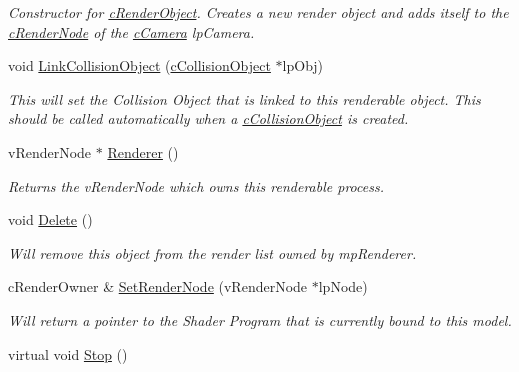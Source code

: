 \begin{DoxyCompactItemize}
\begin{DoxyCompactList}\small\item\em Constructor for \hyperlink{classc_render_object}{cRenderObject}. Creates a new render object and adds itself to the \hyperlink{classc_render_node}{cRenderNode} of the \hyperlink{classc_camera}{cCamera} lpCamera. \end{DoxyCompactList}\item 
\hypertarget{classc_render_object_a9cd352514159783b312cf9d3a6168e8e}{
void \hyperlink{classc_render_object_a9cd352514159783b312cf9d3a6168e8e}{LinkCollisionObject} (\hyperlink{classc_collision_object}{cCollisionObject} $\ast$lpObj)}
\label{classc_render_object_a9cd352514159783b312cf9d3a6168e8e}

\begin{DoxyCompactList}\small\item\em This will set the Collision Object that is linked to this renderable object. This should be called automatically when a \hyperlink{classc_collision_object}{cCollisionObject} is created. \end{DoxyCompactList}\item 
\hypertarget{classc_render_object_a532344b60df3ebd0cf893fa550df318e}{
vRenderNode $\ast$ \hyperlink{classc_render_object_a532344b60df3ebd0cf893fa550df318e}{Renderer} ()}
\label{classc_render_object_a532344b60df3ebd0cf893fa550df318e}

\begin{DoxyCompactList}\small\item\em Returns the vRenderNode which owns this renderable process. \end{DoxyCompactList}\item 
\hypertarget{classc_render_object_a7f1424d2badbe9e09bc6fd4af6616fa0}{
void \hyperlink{classc_render_object_a7f1424d2badbe9e09bc6fd4af6616fa0}{Delete} ()}
\label{classc_render_object_a7f1424d2badbe9e09bc6fd4af6616fa0}

\begin{DoxyCompactList}\small\item\em Will remove this object from the render list owned by mpRenderer. \end{DoxyCompactList}\item 
cRenderOwner \& \hyperlink{classc_render_object_a247947b8d810bf556af4677dd5165983}{SetRenderNode} (vRenderNode $\ast$lpNode)
\begin{DoxyCompactList}\small\item\em Will return a pointer to the Shader Program that is currently bound to this model. \end{DoxyCompactList}\item 
\hypertarget{classc_render_object_a4e4d06cfc220b466c5057105c10d658c}{
virtual void \hyperlink{classc_render_object_a4e4d06cfc220b466c5057105c10d658c}{Stop} ()}
\label{classc_render_object_a4e4d06cfc220b466c5057105c10d658c}


\end{DoxyCompactItemize}
